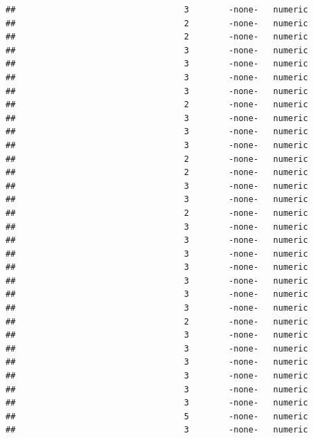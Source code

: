 \documentclass[
  12pt,
]{article}
\begin{document}
\begin{verbatim}
##                                  3        -none-   numeric                    
##                                  2        -none-   numeric                    
##                                  2        -none-   numeric                    
##                                  3        -none-   numeric                    
##                                  3        -none-   numeric                    
##                                  3        -none-   numeric                    
##                                  3        -none-   numeric                    
##                                  2        -none-   numeric                    
##                                  3        -none-   numeric                    
##                                  3        -none-   numeric                    
##                                  3        -none-   numeric                    
##                                  2        -none-   numeric                    
##                                  2        -none-   numeric                    
##                                  3        -none-   numeric                    
##                                  3        -none-   numeric                    
##                                  2        -none-   numeric                    
##                                  3        -none-   numeric                    
##                                  3        -none-   numeric                    
##                                  3        -none-   numeric                    
##                                  3        -none-   numeric                    
##                                  3        -none-   numeric                    
##                                  3        -none-   numeric                    
##                                  3        -none-   numeric                    
##                                  2        -none-   numeric                    
##                                  3        -none-   numeric                    
##                                  3        -none-   numeric                    
##                                  3        -none-   numeric                    
##                                  3        -none-   numeric                    
##                                  3        -none-   numeric                    
##                                  3        -none-   numeric                    
##                                  5        -none-   numeric                    
##                                  3        -none-   numeric                    

\end{verbatim}
\end{document}
